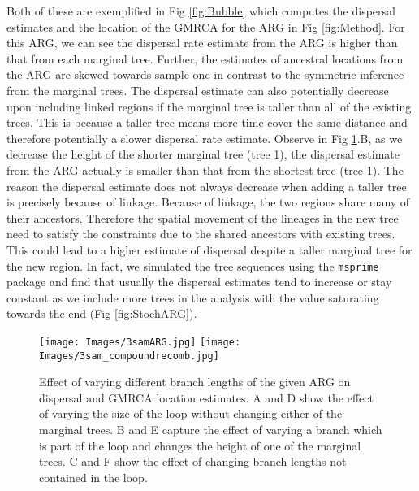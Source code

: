 Both of these are exemplified in Fig \ref{fig:Bubble} which computes the dispersal estimates and the location of the GMRCA for the ARG in Fig \ref{fig:Method}. For this ARG, we can see the dispersal rate estimate from the ARG is higher than that from each marginal tree. Further, the estimates of ancestral locations from the ARG are skewed towards sample one in contrast to the symmetric inference from the marginal trees.  
The dispersal estimate can also potentially decrease upon including linked regions if the  marginal tree is taller than all of the existing trees. This is because a taller tree means more time cover the same distance and therefore potentially a slower dispersal rate estimate. Observe in Fig \ref{fig:3samARG}.B, as we decrease the height of the shorter marginal tree (tree 1), the dispersal estimate from the ARG actually is smaller than that from the shortest tree (tree 1).
The reason the dispersal estimate does not always decrease when adding a taller tree is precisely because of linkage. Because of linkage, the two regions share many of their ancestors. Therefore the spatial movement of the lineages in the new tree need to satisfy the constraints due to the shared ancestors with existing trees. This could lead to a higher estimate of dispersal despite a taller marginal tree for the new region. In fact, we simulated the tree sequences using the {\tt msprime} package and find that usually the dispersal estimates tend to increase or stay constant as we include more trees in the analysis with the value saturating towards the end (Fig \ref{fig:StochARG}). 

\begin{figure}[h]
    \centering
    \texttt{[image: Images/3samARG.jpg]}
    \hspace{0.03\linewidth}
    \texttt{[image: Images/3sam\_compoundrecomb.jpg]}
    \caption{Effect of varying different branch lengths of the given ARG on dispersal and GMRCA location estimates. A and D show the effect of varying the size of the loop without changing either of the marginal trees. B and E capture the effect of varying a branch which is part of the loop and changes the height of one of the marginal trees. C and F show the effect of changing branch lengths not contained in the loop.}
    \label{fig:3samARG}
\end{figure}

